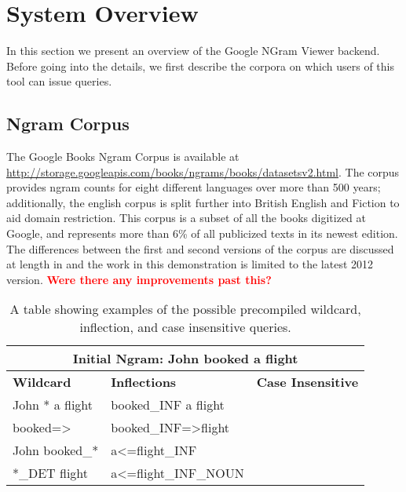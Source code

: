\documentclass[11pt]{article}
\begin{document}
\section{System Overview}

In this section we present an overview of the Google NGram Viewer backend. Before going into the details, we first describe the corpora on which users of this tool can issue queries.

\subsection{Ngram Corpus}
The Google Books Ngram Corpus is available at \url{http://storage.googleapis.com/books/ngrams/books/datasetsv2.html}. The corpus provides ngram counts for eight different languages over more than 500 years; additionally, the english corpus is split further into British English and Fiction to aid domain restriction. This corpus is a subset of all the books digitized at Google, and represents more than 6\% of all publicized texts in its newest edition. The differences between the first and second versions of the corpus are discussed at length in  and the work in this demonstration is limited to the latest 2012 version.
\textcolor{red}{\bf Were there any improvements past this?}


\begin{table*}
\centering
\begin{tabular}{|l|l|l|}
\hline
\multicolumn{3}{|c|}{{\bf Initial Ngram:} John booked a flight}                                 \\ \hline
{\bf Wildcard }           & {\bf Inflections}                    & {\bf Case Insensitive} \\ \hline
John * a flight      & booked\_INF a flight           &                    \\ \hline
booked=\textgreater * & booked\_INF=\textgreater flight &                    \\ \hline
John booked\_*       & a\textless=flight\_INF         &                    \\ \hline
*\_DET flight        & a\textless=flight\_INF\_NOUN   &                    \\ \hline
\end{tabular}
\caption{\label{tab:wildcard}
A table showing examples of the possible precompiled wildcard, inflection, and case insensitive queries.}
\end{table*}
\end{document}
